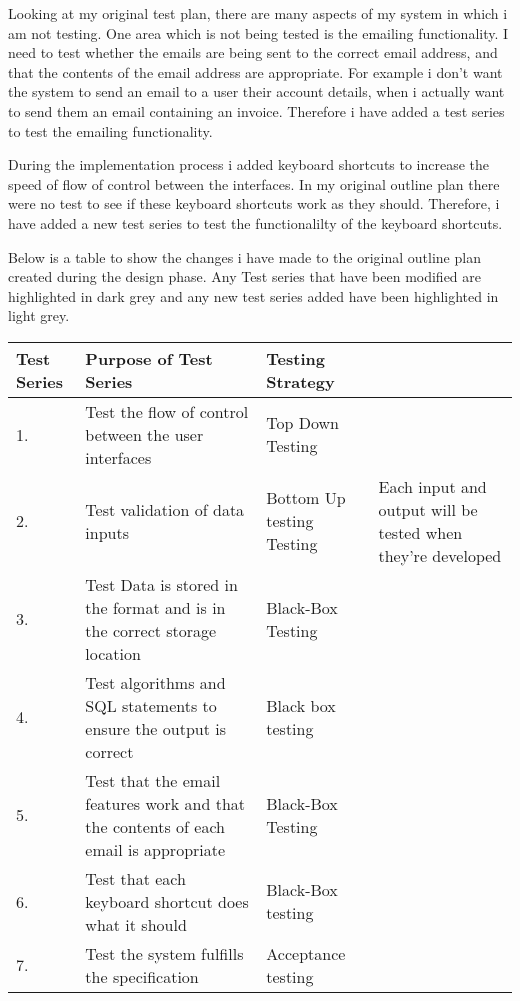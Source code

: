 \begin{landscape}
 Looking at my original test plan, there are many aspects of my system in which i am not testing. One area which is not being tested is the emailing functionality. I need to test whether the emails are being sent to the correct email address, and that the contents of the email address are appropriate. For example i don't want the system to send an email to a user their account details, when i actually want to send them an email containing an invoice. Therefore i have added a test series to test the emailing functionality. \par

During the implementation process i added keyboard shortcuts to increase the speed of flow of control between the interfaces. In my original outline plan there were no test to see if these keyboard shortcuts work as they should. Therefore, i have added a new test series to test the functionalilty of the keyboard shortcuts. \par

Below is a table to show the changes i have made to the original outline plan created during the design phase. Any Test series that have been modified are highlighted in dark grey  and any new test series added have been highlighted in light grey.

\begin{center}
    \begin{tabular}{|p{2cm}|p{5cm}|p{5cm}|p{4cm}|}
        \hline
        \textbf{Test Series} & \textbf{Purpose of Test Series} & \textbf{Testing Strategy} & \\ \hline
	1. & Test the flow of control between the user interfaces & Top Down Testing &  \\ \hline
	2. & Test validation of data inputs & Bottom Up testing Testing &  Each input and output will be tested when they're developed\\ \hline
	\rowcolor{orange}  3. & Test Data is stored in the format and is in the correct storage location & Black-Box Testing & \\ \hline
	4. & Test algorithms and SQL statements to ensure the output is correct & Black box testing &\\ \hline
	\rowcolor{green} 5. & Test that the email features work and that the contents of each email is appropriate & Black-Box Testing &\\ \hline
	\rowcolor{green} 6. & Test that each keyboard shortcut does what it should & Black-Box testing & \\ \hline
	7. & Test the system fulfills the specification & Acceptance testing & \\ \hline


\end{tabular}
\end{center}
\end{landscape}
